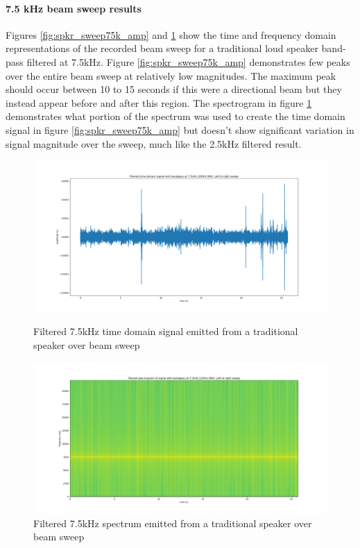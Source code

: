 \newpage
\paragraph{7.5 kHz beam sweep results}

Figures \ref{fig:spkr_sweep75k_amp} and \ref{fig:spkr_sweep75k_spectro} show the time and frequency domain representations of the recorded beam sweep for a traditional loud speaker band-pass filtered at 7.5kHz. Figure \ref{fig:spkr_sweep75k_amp} demonstrates few peaks over the entire beam sweep at relatively low magnitudes. The maximum peak should occur between 10 to 15 seconds if this were a directional beam but they instead appear before and after this region. The spectrogram in figure \ref{fig:spkr_sweep75k_spectro} demonstrates what portion of the spectrum was used to create the time domain signal in figure \ref{fig:spkr_sweep75k_amp} but doesn't show significant variation in signal magnitude over the sweep, much like the 2.5kHz filtered result.
\begin{figure}[ht!]
    \centering
    \begin{minipage}{0.49\textwidth}
        \centering
        \includegraphics[width=\textwidth]{Figures/Testing/BeamSweep/Classical_speaker/7_5k_amp_sweep_spkr.png}
        \caption{Filtered 7.5kHz time domain signal emitted from a traditional speaker over beam sweep}
        \label{fig:spkr_sweep75k_amp}
    \end{minipage}\hfill
    \begin{minipage}{0.49\textwidth}
        \centering
        \includegraphics[width=\textwidth]{Figures/Testing/BeamSweep/Classical_speaker/7_5k_freq_sweep_spkr.png}
        \caption{Filtered 7.5kHz spectrum emitted from a traditional speaker over beam sweep}
        \label{fig:spkr_sweep75k_spectro}
    \end{minipage}
\end{figure}

